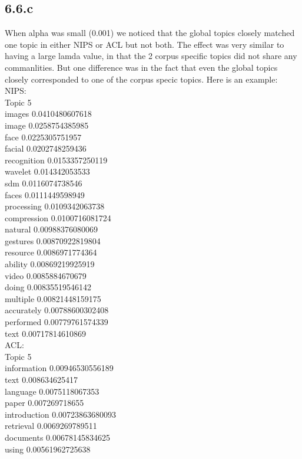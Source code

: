 \documentclass{article}
\begin{document}
\subsection*{6.6.c}
When alpha was small (0.001) we noticed that the global topics closely matched one topic in either NIPS or ACL but not both.
The effect was very similar to having a large lamda value, in that the 2 corpus specific topics did not share any commanlities. But one difference was in the fact that even the global topics closely corresponded to one of the corpus specic topics. Here is an example:
NIPS:\\
Topic 5\\
images 0.0410480607618\\
image 0.0258754385985\\
face 0.0225305751957\\
facial 0.0202748259436\\
recognition 0.0153357250119\\
wavelet 0.014342053533\\
sdm 0.0116074738546\\
faces 0.0111449598949\\
processing 0.0109342063738\\
compression 0.0100716081724\\
natural 0.00988376080069\\
gestures 0.00870922819804\\
resource 0.0086971774364\\
ability 0.00869219925919\\
video 0.0085884670679\\
doing 0.00835519546142\\
multiple 0.00821448159175\\
accurately 0.00788600302408\\
performed 0.00779761574339\\
text 0.00717814610869\\
ACL:\\
Topic 5\\
information 0.00946530556189\\
text 0.008634625417\\
language 0.0075118067353\\
paper 0.007269718655\\
introduction 0.00723863680093\\
retrieval 0.0069269789511\\
documents 0.00678145834625\\
using 0.00561962725638\\
\end{document}
